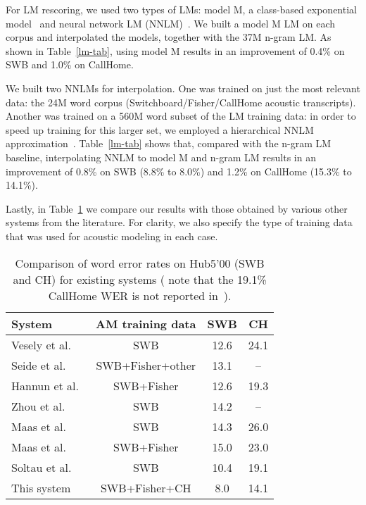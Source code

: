 \documentclass[a4paper]{article}
\begin{document}
For LM rescoring, we used two types of LMs: model M, a class-based
exponential model~\cite{chen09} and neural network LM
(NNLM)~\cite{Bengio03,Emami06,Schwenk07,emamiasru07}.  We built a
model M LM on each corpus and interpolated the models, together with
the 37M n-gram LM.  As shown in Table~\ref{lm-tab}, using model M
results in an improvement of 0.4\% on SWB and 1.0\% on CallHome.  

We built two NNLMs for interpolation. One was trained on just the most
relevant data: the 24M word corpus (Switchboard/Fisher/CallHome
acoustic transcripts).  Another was trained on a 560M word subset of
the LM training data: in order to speed up training for this larger
set, we employed a hierarchical NNLM
approximation~\cite{Emami06,kuo2012large}.  Table~\ref{lm-tab} shows
that, compared with the n-gram LM baseline, interpolating NNLM to
model M and n-gram LM results in an improvement of 0.8\% on SWB (8.8\%
to 8.0\%) and 1.2\% on CallHome (15.3\% to 14.1\%).

 
Lastly, in Table~\ref{comparison} we compare our results with those
obtained by various other systems from the literature. For clarity, we
also specify the type of training data that was used for acoustic
modeling in each case.

\begin{table}[htpb!]
\begin{center}
\begin{tabular}{|l|c|c|c|} \hline
System                          & AM training data & SWB & CH\\ \hline 
Vesely et al.~\cite{vesely13}   & SWB           & 12.6  & 24.1 \\ \hline
Seide et al.~\cite{seide14}     & SWB+Fisher+other    & 13.1  & --   \\ \hline
Hannun et al.~\cite{hannun14}   & SWB+Fisher    & 12.6  & 19.3 \\ \hline
Zhou et al.~\cite{zhou14}       & SWB           & 14.2  & --   \\ \hline
Maas et al.~\cite{maas14}       & SWB           & 14.3  & 26.0 \\ \hline
Maas et al.~\cite{maas14}       & SWB+Fisher    & 15.0  & 23.0 \\ \hline
Soltau et al.~\cite{soltau14}   & SWB           & 10.4  & 19.1\\ \hline
This system                     & SWB+Fisher+CH & 8.0   & 14.1\\ \hline
\end{tabular}
\end{center}
\caption{\label{comparison}
Comparison of word error rates on Hub5'00 (SWB and CH) for existing systems ( note that 
the 19.1\% CallHome WER is not reported in~\cite{soltau14}).}
\end{table}
\end{document}
